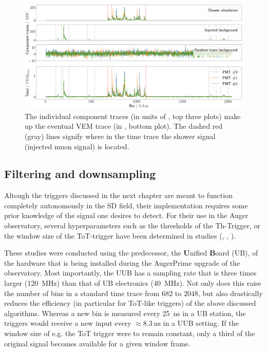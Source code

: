 \begin{figure}
	\centering
	\includegraphics[width=\textwidth]{./plots/component_adding.png}
	\caption{The individual component traces (in units of \SI{}{\ADC}, top three plots) make up the eventual VEM trace (in \SI{}{\Peak}, bottom plot). The dashed 
    red (gray) lines signify where in the time trace the shower signal (injected muon signal) is located.}
	\label{fig:component_adding}
\end{figure}

\subsection{Filtering and downsampling}
\label{ssec:filtering-and-downsampling}

Altough the triggers discussed in the next chapter are meant to function completely autonomously in the SD field, their implementation requires some prior 
knowledge of the signal one desires to detect. For their use in the Auger observatory, several hyperparameters such as the thresholds of the Th-Trigger, or the 
window size of the ToT-trigger have been determined in studies (\cite{bertou2006calibration}, \cite{triggerSettings}, \cite{ToTtriggerSetting}). 

These studies were conducted using the predecessor, the \textbf{U}nified \textbf{B}oard (UB), of the hardware that is being installed during the AugerPrime upgrade
of the observatory. Most importantly, the UUB has a sampling rate that is three times larger (\SI{120}{\mega\hertz}) than that of UB electronics 
(\SI{40}{\mega\hertz}). Not only does this raise the number of bins in a standard time trace from $682$ to $2048$, but also drastically reduces the efficiency 
(in particular for ToT-like triggers) of the above discussed algorithms. Whereas a new  bin is measured every \SI{25}{\nano\second} in a UB station, the triggers 
would receive a new input every $\approx\SI{8.3}{\nano\second}$ in a UUB setting. If the window size of e.g. the ToT trigger were to remain constant, only a third
of the original signal becomes available for a given window frame.

